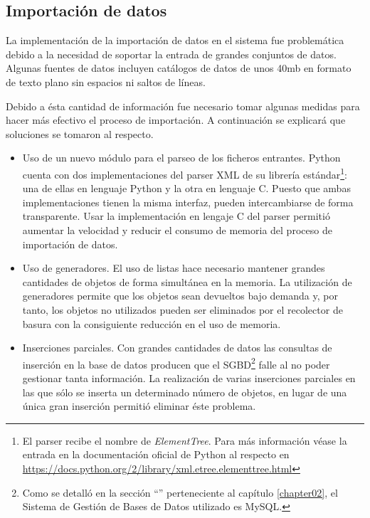 	\subsection{Importación de datos}
	\label{implementacion:importacion de datos}
		
		La implementación de la importación de datos en el sistema fue problemática debido a la necesidad de soportar la entrada de grandes conjuntos de datos.  Algunas fuentes de datos incluyen catálogos de datos de unos 40mb en formato de texto plano sin espacios ni saltos de líneas.
		
		Debido a ésta cantidad de información fue necesario tomar algunas medidas para hacer más efectivo el proceso de importación.  A continuación se explicará que soluciones se tomaron al respecto.
		\begin{itemize}
			\item
				Uso de un nuevo módulo para el parseo de los ficheros entrantes.  Python cuenta con dos implementaciones del parser XML de su librería estándar\footnote{El parser recibe el nombre de \textit{ElementTree}.  Para más información véase la entrada en la documentación oficial de Python al respecto en \url{https://docs.python.org/2/library/xml.etree.elementtree.html}}: una de ellas en lenguaje Python y la otra en lenguaje C.  Puesto que ambas implementaciones tienen la misma interfaz, pueden intercambiarse de forma transparente.  Usar la implementación en lengaje C del parser permitió aumentar la velocidad y reducir el consumo de memoria del proceso de importación de datos.
			\item
				Uso de generadores.  El uso de listas hace necesario mantener grandes cantidades de objetos de forma simultánea en la memoria.  La utilización de generadores permite que los objetos sean devueltos bajo demanda y, por tanto, los objetos no utilizados pueden ser eliminados por el recolector de basura con la consiguiente reducción en el uso de memoria.
			\item
				Inserciones parciales.  Con grandes cantidades de datos las consultas de inserción en la base de datos producen que el SGBD\footnote{Como se detalló en la sección ``'' perteneciente al capítulo \ref{chapter02}, el Sistema de Gestión de Bases de Datos utilizado es MySQL.} falle al no poder gestionar tanta información.  La realización de varias inserciones parciales en las que sólo se inserta un determinado número de objetos, en lugar de una única gran inserción permitió eliminar éste problema.
		\end{itemize}
		
